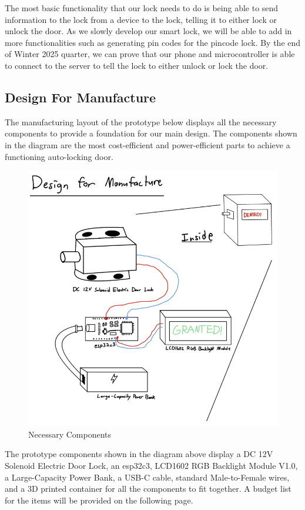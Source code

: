 The most basic functionality that our lock needs to do is being able to send information to the lock from a device to the lock, telling it to either lock or unlock the door. As we slowly develop our smart lock, we will be able to add in more functionalities such as generating pin codes for the pincode lock. By the end of Winter 2025 quarter, we can prove that our phone and microcontroller is able to connect to the server to tell the lock to either unlock or lock the door.

\newpage
\subsection{Design For Manufacture}

The manufacturing layout of the prototype below displays all the necessary components to provide a foundation for our main design. The components shown in the diagram are the most cost-efficient and power-efficient parts to achieve a functioning auto-locking door.

\begin{figure}[!ht]
    \centering
    \includegraphics[width=0.85\linewidth]{./img/DFM.png}
    \caption{Necessary Components}
    \label{fig:enter-label}
\end{figure}

The prototype components shown in the diagram above display a DC 12V Solenoid Electric Door Lock, an esp32c3, LCD1602 RGB Backlight Module V1.0, a Large-Capacity Power Bank, a USB-C cable, standard Male-to-Female wires, and a 3D printed container for all the components to fit together. A budget list for the items will be provided on the following page.

\newpage